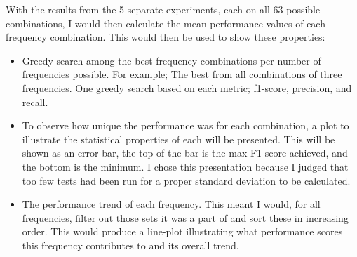         With the results from the 5 separate experiments, each on all 63 possible combinations, I would then calculate the mean performance values of each frequency combination. This would then be used to show these properties:
        \begin{itemize}

            \item Greedy search among the best frequency combinations per number of frequencies possible. For example; The best from all combinations of three frequencies. One greedy search based on each metric; f1-score, precision, and recall.
            \item To observe how unique the performance was for each combination, a plot to illustrate the statistical properties of each will be presented. This will be shown as an error bar, the top of the bar is the max F1-score achieved, and the bottom is the minimum. I chose this presentation because I judged that too few tests had been run for a proper standard deviation to be calculated.
            \item The performance trend of each frequency. This meant I would, for all frequencies, filter out those sets it was a part of and sort these in increasing order. This would produce a line-plot illustrating what performance scores this frequency contributes to and its overall trend.
        \end{itemize}